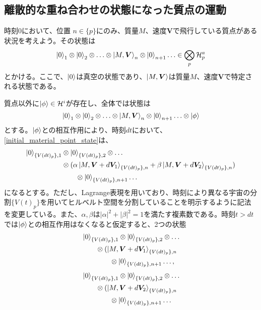 \subsection{離散的な重ね合わせの状態になった質点の運動}
時刻$0$において、位置 $n \in \{p\}$にのみ、質量$M$、速度$\bm{V}$で飛行している質点がある状況を考えよう。その状態は
\begin{equation}
    \label{initial_material_point_state}
    \ket{0}_1 \otimes \ket{0}_2 \otimes \ldots \otimes \ket{M,\bm{V}}_n \otimes \ket{0}_{n+1} \ldots \in \bigotimes_p \mathcal{H}_p^a
\end{equation}
とかける。ここで、$\ket{0}$は真空の状態であり、$\ket{M,\bm{V}}$は質量$M$、速度$\mathbf{V}$で特定される状態である。\par
質点以外に$\ket{\phi} \in \mathcal{H}^i$が存在し、全体では状態は
\begin{equation}
    \ket{0}_1 \otimes \ket{0}_2 \otimes \ldots \otimes \ket{M,\bm{V}}_n \otimes \ket{0}_{n+1} \ldots \otimes \ket{\phi} 
\end{equation}
とする。$\ket{\phi}$との相互作用により、時刻$dt$において、\eqref{initial_material_point_state}は、
\begin{equation}
\begin{aligned}
    \ket{0}_{\{V(dt)_p\},1} & \otimes \ket{0}_{\{V(dt)_p\},2} \otimes \ldots \\ 
    & \otimes (\alpha \ket{M,\bm{V}+d\bm{V}_1}_{\{V(dt)_p\},n} + \beta \ket{M,\bm{V}+d\bm{V}_2}_{\{V(dt)_p\},n}) \\
    & \qquad \otimes \ket{0}_{\{V(dt)_p\},n+1} \ldots 
\end{aligned}
\end{equation}
になるとする。ただし、Lagrange表現を用いており、時刻により異なる宇宙の分割$\{V(t)_p\}$を用いてヒルベルト空間を分割していることを明示するように記法を変更している。また、$\alpha,\beta$は$|\alpha|^2+|\beta|^2=1$を満たす複素数である。時刻$t>dt$では$\ket{\phi}$との相互作用はなくなると仮定すると、2つの状態 
\begin{equation}
\begin{aligned}
    & \ket{0}_{\{V(dt)_p\},1}  \otimes \ket{0}_{\{V(dt)_p\},2} \otimes \ldots \\ 
    & \qquad \otimes (\ket{M,\bm{V}+d\bm{V}_1}_{\{V(dt)_p\},n} \\
    & \qquad \qquad \otimes \ket{0}_{\{V(dt)_p\},n+1} \ldots ,
\end{aligned}
\end{equation}
\begin{equation}
\begin{aligned}
    &\ket{0}_{\{V(dt)_p\},1}  \otimes \ket{0}_{\{V(dt)_p\},2} \otimes \ldots \\ 
    & \qquad \otimes (\ket{M,\bm{V}+d\bm{V}_2}_{\{V(dt)_p\},n} \\
    & \qquad \qquad \otimes \ket{0}_{\{V(dt)_p\},n+1} \ldots 
\end{aligned}
\end{equation}
